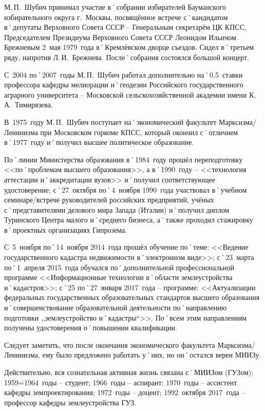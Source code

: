 М.\,П.~Шубич принимал участие в˚собрании избирателей Бауманского избирательного округа г.~Москвы, посвящённое встрече с˚кандидатом в˚депутаты Верховного Совета СССР \--- Генеральным секретарём ЦК КПСС, Председателем Президиума Верховного Совета СССР Леонидом Ильичом Брежневым 2~мая 1979~года в˚Кремлёвском дворце съездов. Сидел в˚третьем ряду, напротив Л.\,И.~Брежнева. После˚собрания состоялся большой концерт. 

С~2004 по˚2007~годы М.\,П.~Шубич работал дополнительно на˚0,5~ставки профессора кафедры мелиорации и˚геодезии Российского государственного аграрного университета \--- Московской сельскохозяйственной академии имени К.\,А.~Тимирязева.

В~1975~году М.\,П.~Шубич поступает на˚экономический факультет Марксизма\-/Ленинизма при Московском горкоме КПСС, который окончил с˚отличием в˚1977~году и˚получил высшее политическое образование.

По˚линии Министерства образования в˚1984~году прошёл переподготовку <<по˚проблемам высшего образования>>, а в˚1990~году \--- <<технология аттестации и˚аккредитации вузов>> и˚получил соответствующее удостоверение; с˚27~октября по˚4~ноября 1990~года участвовал в˚учебном семинаре\-/встрече руководителей российских предприятий, учёных с˚представителями делового мира Запада (Италии) и˚получил диплом Туринского Центра малого и˚среднего бизнеса, а˚также проходил стажировку в˚проектных организациях Гипрозема.

С~5~ноября по˚14~ноября 2014~года прошёл обучение по˚теме: <<Ведение государственного кадастра недвижимости в˚электронном виде>>; с˚23~марта по˚1~апреля 2015~года обучался по˚дополнительной профессиональной программе <<Информационные технологии в˚области землеустройства и˚кадастров>>; с˚25 по˚27~января 2017~года \--- программе: <<Актуализации федеральных государственных образовательных стандартов высшего образования и˚совершенствование образовательной деятельности по˚направлению подготовки ,,землеустройство и˚кадастры``>>. По˚всем этим направлениям получены удостоверения о˚повышении квалификации. 

Следует заметить, что после окончания экономического факультета Марксизма\-/Ленинизма, ему было предложено работать у˚них, но он˚остался верен МИИЗу.

Действительно, вся сознательная активная жизнь связана с˚МИИЗом (ГУЗом): 1959\==1964~годы \--- студент; 1966~годы \--- аспирант; 1970~годы \--- ассистент кафедры земпроектирования; 1972~годы \--- доцент; 1992~октября 2017~года \--- профессор кафедры землеустройства ГУЗ.

